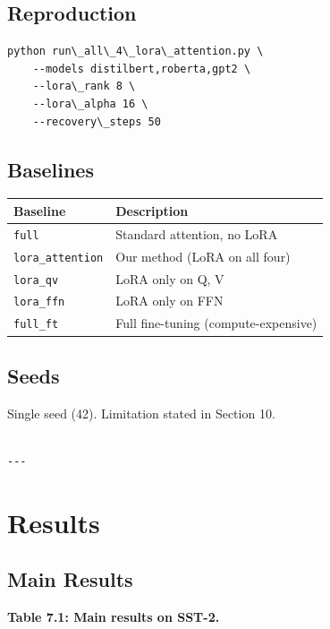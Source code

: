 \subsection{Reproduction}

\begin{lstlisting}
python run\_all\_4\_lora\_attention.py \
    --models distilbert,roberta,gpt2 \
    --lora\_rank 8 \
    --lora\_alpha 16 \
    --recovery\_steps 50
\end{lstlisting}

\subsection{Baselines}

\begin{table}[H]
\centering
\small
\begin{tabular}{ll}
\toprule
\textbf{Baseline} & \textbf{Description} \\
\midrule
\texttt{full} & Standard attention, no LoRA \\
\texttt{lora\_attention} & Our method (LoRA on all four) \\
\texttt{lora\_qv} & LoRA only on Q, V \\
\texttt{lora\_ffn} & LoRA only on FFN \\
\texttt{full\_ft} & Full fine-tuning (compute-expensive) \\
\bottomrule
\end{tabular}
\end{table}

\subsection{Seeds}

Single seed (42). Limitation stated in Section 10.
\begin{lstlisting}

---
\end{lstlisting}

\section{Results}

\subsection{Main Results}

\textbf{Table 7.1: Main results on SST-2.}

